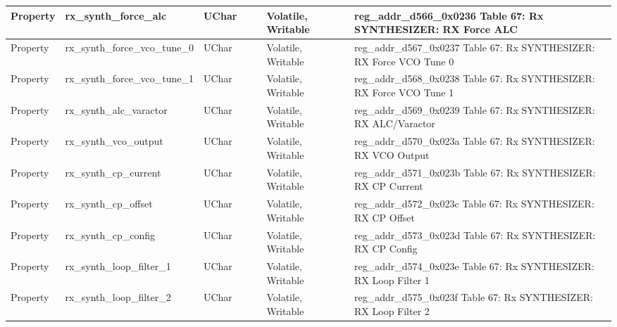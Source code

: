 \documentclass{article}
\begin{document}
\begin{scriptsize}
\begin{longtable}{|p{2cm}|p{5cm}|p{1cm}|p{2cm}|p{2cm}|p{1.75cm}|p{1.5cm}|p{5.1cm}|}
  \hline
  Property & rx\_synth\_force\_alc                                    & UChar &                  &                  & Volatile,  Writable &         & reg\_addr\_d566\_0x0236 Table 67: Rx SYNTHESIZER: RX Force ALC \\
  \hline
  Property & rx\_synth\_force\_vco\_tune\_0                           & UChar &                  &                  & Volatile,  Writable &         & reg\_addr\_d567\_0x0237 Table 67: Rx SYNTHESIZER: RX Force VCO Tune 0 \\
  \hline
  Property & rx\_synth\_force\_vco\_tune\_1                           & UChar &                  &                  & Volatile,  Writable &         & reg\_addr\_d568\_0x0238 Table 67: Rx SYNTHESIZER: RX Force VCO Tune 1 \\
  \hline
  Property & rx\_synth\_alc\_varactor                                 & UChar &                  &                  & Volatile,  Writable &         & reg\_addr\_d569\_0x0239 Table 67: Rx SYNTHESIZER: RX ALC/Varactor \\
  \hline
  Property & rx\_synth\_vco\_output                                   & UChar &                  &                  & Volatile,  Writable &         & reg\_addr\_d570\_0x023a Table 67: Rx SYNTHESIZER: RX VCO Output \\
  \hline
  Property & rx\_synth\_cp\_current                                   & UChar &                  &                  & Volatile,  Writable &         & reg\_addr\_d571\_0x023b Table 67: Rx SYNTHESIZER: RX CP Current \\
  \hline
  Property & rx\_synth\_cp\_offset                                    & UChar &                  &                  & Volatile,  Writable &         & reg\_addr\_d572\_0x023c Table 67: Rx SYNTHESIZER: RX CP Offset \\
  \hline
  Property & rx\_synth\_cp\_config                                    & UChar &                  &                  & Volatile,  Writable &         & reg\_addr\_d573\_0x023d Table 67: Rx SYNTHESIZER: RX CP Config \\
  \hline
  Property & rx\_synth\_loop\_filter\_1                               & UChar &                  &                  & Volatile,  Writable &         & reg\_addr\_d574\_0x023e Table 67: Rx SYNTHESIZER: RX Loop Filter 1 \\
  \hline
  Property & rx\_synth\_loop\_filter\_2                               & UChar &                  &                  & Volatile,  Writable &         & reg\_addr\_d575\_0x023f Table 67: Rx SYNTHESIZER: RX Loop Filter 2 \\

\end{longtable}
\end{scriptsize}
\end{document}
